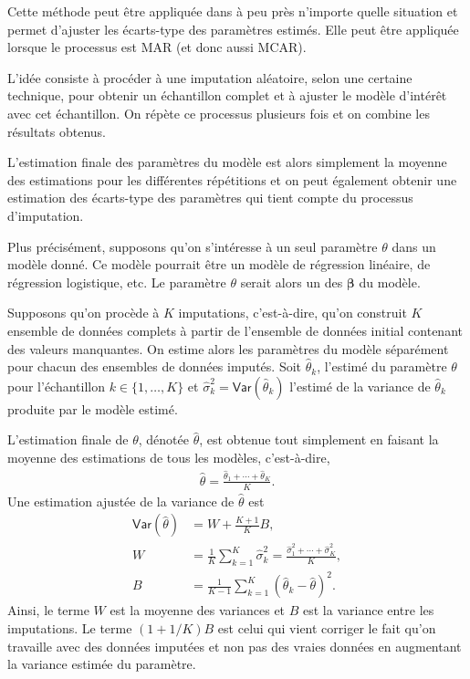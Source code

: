 \documentclass[
  11pt,
  letterpaper,
]{book}
\theoremstyle{definition}
\theoremstyle{definition}
\theoremstyle{definition}
\theoremstyle{definition}
\theoremstyle{remark}
\begin{document}
Cette méthode peut être appliquée dans à peu près n'importe quelle situation et permet d'ajuster les écarts-type des paramètres estimés. Elle peut être appliquée lorsque le processus est MAR (et donc aussi MCAR).

L'idée consiste à procéder à une imputation aléatoire, selon une certaine technique, pour obtenir un échantillon complet et à ajuster le modèle d'intérêt avec cet échantillon. On répète ce processus plusieurs fois et on combine les résultats obtenus.

L'estimation finale des paramètres du modèle est alors simplement la moyenne des estimations pour les différentes répétitions et on peut également obtenir une estimation des écarts-type des paramètres qui tient compte du processus d'imputation.

Plus précisément, supposons qu'on s'intéresse à un seul paramètre \(\theta\) dans un modèle donné. Ce modèle pourrait être un modèle de régression linéaire, de régression logistique, etc. Le paramètre \(\theta\) serait alors un des \(\boldsymbol{\beta}\) du modèle.

Supposons qu'on procède à \(K\) imputations, c'est-à-dire, qu'on construit \(K\) ensemble de données complets à partir de l'ensemble de données initial contenant des valeurs manquantes. On estime alors les paramètres du modèle séparément pour chacun des ensembles de données imputés. Soit \(\widehat{\theta}_k\), l'estimé du paramètre \(\theta\) pour l'échantillon \(k \in \{1, \ldots, K\}\) et \(\widehat{\sigma}_k^2={\mathsf{Var}}\left(\widehat{\theta}_k\right)\) l'estimé de la variance de \(\widehat{\theta}_k\) produite par le modèle estimé.

L'estimation finale de \(\theta\), dénotée \(\widehat{\theta}\), est obtenue tout simplement en faisant la moyenne des estimations de tous les modèles, c'est-à-dire,
\begin{align*}
\widehat{\theta} = \frac{\widehat{\theta}_1 + \cdots + \widehat{\theta}_K}{K}.
\end{align*}
Une estimation ajustée de la variance de \(\widehat{\theta}\) est
\begin{align*}
{\mathsf{Var}}\left(\hat{\theta}\right) &= W+ \frac{K+1}{K}B, 
\\ W &= \frac{1}{K} \sum_{k=1}^K \widehat{\sigma}^2_k = \frac{\widehat{\sigma}_1^2 + \cdots + \widehat{\sigma}_K^2}{K},\\
B &= \frac{1}{K-1} \sum_{k=1}^K (\widehat{\theta}_k - \widehat{\theta})^2.
\end{align*}
Ainsi, le terme \(W\) est la moyenne des variances et \(B\) est la variance entre les imputations. Le terme \((1+1/K)B\) est celui qui vient corriger le fait qu'on travaille avec des données imputées et non pas des vraies données en augmentant la variance estimée du paramètre.
\end{document}
